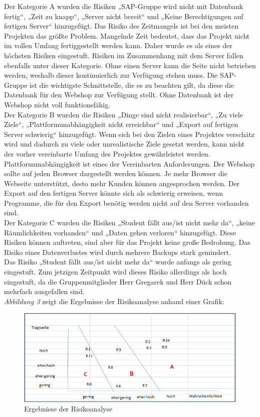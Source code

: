 Der Kategorie A wurden die Risiken „SAP-Gruppe wird nicht mit Datenbank fertig“, „Zeit zu knapp“, „Server nicht bereit“ und „Keine Berechtigungen auf fertigen Server“ hinzugefügt.  Das Risiko des Zeitmangels ist bei den meisten Projekten das größte Problem. Mangelnde Zeit bedeutet, dass das Projekt nicht im vollen Umfang fertiggestellt werden kann. Daher wurde es als eines der höchsten Risiken eingestuft. Risiken im Zusammenhang mit dem Server fallen ebenfalls unter dieser Kategorie. Ohne einen Server kann die Seite nicht betrieben werden, weshalb dieser kontinuierlich zur Verfügung stehen muss. Die SAP-Gruppe ist die wichtigste Schnittstelle, die es zu beachten gilt, da diese die Datenbank für den Webshop zur Verfügung stellt. Ohne Datenbank ist der Webshop nicht voll funktionsfähig.
\\
Der Kategorie B wurden die Risiken „Dinge sind nicht realisierbar“, „Zu viele Ziele“, „Plattformunabhängigkeit nicht erreichbar“ und „Export auf fertigen Server schwierig“ hinzugefügt. Wenn sich bei den Zielen eines Projektes verschätz wird und dadurch zu viele oder unrealistische Ziele gesetzt werden, kann nicht der vorher vereinbarte Umfang des Projektes gewährleistet werden. Plattformunabhängigkeit ist eines der Vereinbarten Anforderungen. Der Webshop sollte auf jeden Browser dargestellt werden können. Je mehr Browser die Webseite unterstützt, desto mehr Kunden können angesprochen werden. Der Export auf den fertigen Server könnte sich als schwierig erweisen, wenn Programme, die für den Export benötig werden nicht auf den Server vorhanden sind.
\\
Der Kategorie C wurden die Risiken „Student fällt aus/ist nicht mehr da“, „keine Räumlichkeiten vorhanden“ und „Daten gehen verloren“ hinzugefügt. Diese Risiken können auftreten, sind aber für das Projekt keine große Bedrohung. Das Risiko eines Datenverlustes wird durch mehrere Backups stark gemindert.
\\
Das Risiko „Student fällt aus/ist nicht mehr da“ wurde anfangs als gering eingestuft.  Zum jetzigen Zeitpunkt wird dieses Risiko allerdings als hoch eingestuft, da die Gruppenmitglieder Herr Gregarek und Herr Dück schon mehrfach ausgefallen sind.
\\
\textit{Abbildung 3} zeigt die Ergebnisse der Risikoanalyse anhand einer Grafik:

\begin{figure}[H] 
  \centering
     \includegraphics[width=15cm]{Bilder/Risikoanalyse2.png}
  \caption{Ergebnisse der Risikoanalyse}
  \label{fig:Abbildung 3}
\end{figure}

